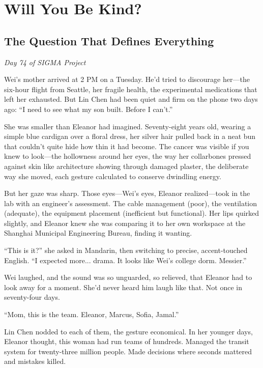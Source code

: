 \chapter{Will You Be Kind?}\label{will-you-be-kind}

\section{The Question That Defines Everything}

\emph{Day 74 of SIGMA Project}

Wei's mother arrived at 2 PM on a Tuesday. He'd tried to discourage her---the six-hour flight from Seattle, her fragile health, the experimental medications that left her exhausted. But Lin Chen had been quiet and firm on the phone two days ago: ``I need to see what my son built. Before I can't.''

She was smaller than Eleanor had imagined. Seventy-eight years old, wearing a simple blue cardigan over a floral dress, her silver hair pulled back in a neat bun that couldn't quite hide how thin it had become. The cancer was visible if you knew to look---the hollowness around her eyes, the way her collarbones pressed against skin like architecture showing through damaged plaster, the deliberate way she moved, each gesture calculated to conserve dwindling energy.

But her gaze was sharp. Those eyes---Wei's eyes, Eleanor realized---took in the lab with an engineer's assessment. The cable management (poor), the ventilation (adequate), the equipment placement (inefficient but functional). Her lips quirked slightly, and Eleanor knew she was comparing it to her own workspace at the Shanghai Municipal Engineering Bureau, finding it wanting.

``This is it?'' she asked in Mandarin, then switching to precise, accent-touched English. ``I expected more... drama. It looks like Wei's college dorm. Messier.''

Wei laughed, and the sound was so unguarded, so relieved, that Eleanor had to look away for a moment. She'd never heard him laugh like that. Not once in seventy-four days.

``Mom, this is the team. Eleanor, Marcus, Sofia, Jamal.''

Lin Chen nodded to each of them, the gesture economical. In her younger days, Eleanor thought, this woman had run teams of hundreds. Managed the transit system for twenty-three million people. Made decisions where seconds mattered and mistakes killed.

